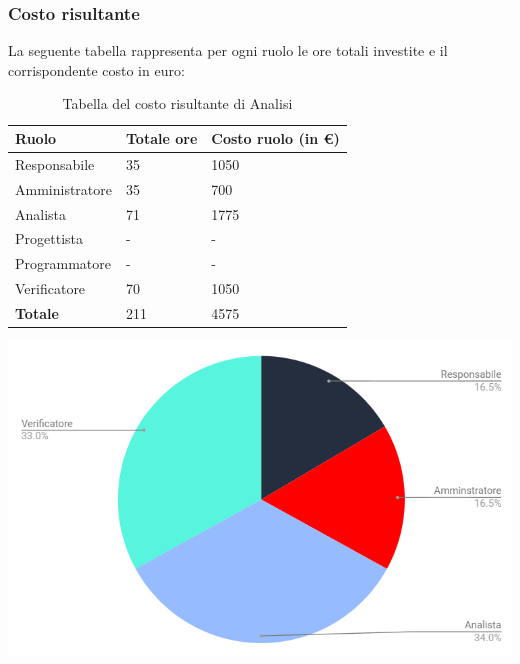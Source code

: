 \subsubsection{Costo risultante}
La seguente tabella rappresenta per ogni ruolo le ore totali investite e il corrispondente costo in euro:
{
\renewcommand{\arraystretch}{2}
\begin{longtable}{ C{3cm} C{2cm} C{4cm}}
\caption{Tabella del costo risultante di Analisi}\\
\rowcolor{\primaryColor}

\textcolor{\secondaryColor}{\textbf{Ruolo}} & 
\textcolor{\secondaryColor}{\textbf{Totale ore}} & 
\textcolor{\secondaryColor}{\textbf{Costo ruolo (in \euro{})}}\\	
\endhead

Responsabile    &  35 &  1050 \\
Amministratore  &  35 &  700 \\
Analista        &  71 & 1775 \\
Progettista     &   - &  - \\
Programmatore   &   - &  - \\
Verificatore    &  70 & 1050 \\
\textbf{Totale} & 211 & 4575 \\
		
\end{longtable}
}

\vskip 30pt %
\includegraphics[width=1\textwidth]{./src/Preventivo/src/img/TortaAnalisi.png}
